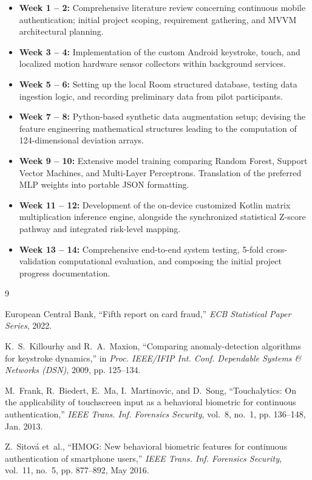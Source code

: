 \documentclass[12pt,a4paper]{report}
\begin{document}
\begin{itemize}
    \item \textbf{Week 1 -- 2:} Comprehensive literature review concerning continuous mobile authentication; initial project scoping, requirement gathering, and MVVM architectural planning.
    \item \textbf{Week 3 -- 4:} Implementation of the custom Android keystroke, touch, and localized motion hardware sensor collectors within background services.
    \item \textbf{Week 5 -- 6:} Setting up the local Room structured database, testing data ingestion logic, and recording preliminary data from pilot participants.
    \item \textbf{Week 7 -- 8:} Python-based synthetic data augmentation setup; devising the feature engineering mathematical structures leading to the computation of 124-dimensional deviation arrays.
    \item \textbf{Week 9 -- 10:} Extensive model training comparing Random Forest, Support Vector Machines, and Multi-Layer Perceptrons. Translation of the preferred MLP weights into portable JSON formatting.
    \item \textbf{Week 11 -- 12:} Development of the on-device customized Kotlin matrix multiplication inference engine, alongside the synchronized statistical Z-score pathway and integrated risk-level mapping.
    \item \textbf{Week 13 -- 14:} Comprehensive end-to-end system testing, 5-fold cross-validation computational evaluation, and composing the initial project progress documentation.
\end{itemize}

\renewcommand{\bibname}{References}
\begin{thebibliography}{9}

European Central Bank, ``Fifth report on card fraud,'' \textit{ECB Statistical Paper Series}, 2022.

K.~S.~Killourhy and R.~A.~Maxion, ``Comparing anomaly-detection algorithms for keystroke dynamics,'' in \textit{Proc. IEEE/IFIP Int. Conf. Dependable Systems \& Networks (DSN)}, 2009, pp. 125--134.

M.~Frank, R.~Biedert, E.~Ma, I.~Martinovic, and D.~Song, ``Touchalytics: On the applicability of touchscreen input as a behavioral biometric for continuous authentication,'' \textit{IEEE Trans. Inf. Forensics Security}, vol.~8, no.~1, pp. 136--148, Jan. 2013.

Z.~Sitov\'{a} et~al., ``HMOG: New behavioral biometric features for continuous authentication of smartphone users,'' \textit{IEEE Trans. Inf. Forensics Security}, vol.~11, no.~5, pp. 877--892, May 2016.

\end{thebibliography}
\end{document}
